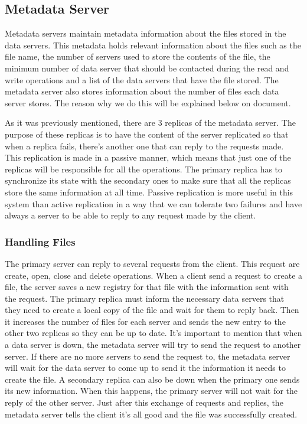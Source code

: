 \subsection{Metadata Server}

Metadata servers maintain metadata information about the files stored
in the data servers. This metadata holds relevant information about
the files such as the file name, the number of servers used to store
the contents of the file, the minimum number of data server that should
be contacted during the read and write operations and a list of the
data servers that have the file stored. The metadata server also stores
information about the number of files each data server stores. The reason why
we do this will be explained below on document.

As it was previously mentioned, there are 3 replicas of the metadata
server. The purpose of these replicas is to have the content of the
server replicated so that when a replica fails, there's another one
that can reply to the requests made. This replication is made in a
passive manner, which means that just one of the replicas will be
responsible for all the operations. The primary replica has to
synchronize its state with the secondary ones to make sure that all
the replicas store the same information at all time. Passive replication
is more useful in this system than active replication in a way that we
can tolerate two failures and have always a server to be able to reply to
any request made by the client.

\subsubsection{Handling Files}

The primary server can reply to several requests from the client. This
request are create, open, close and delete operations.
When a client send a request to create a file, the server saves a new
registry for that file with the information sent with the request. The
primary replica must inform the necessary data servers that they need to
create a local copy of the file and wait for them to reply back. Then
it increases the number of files for each server and sends the new 
entry to the other two replicas so they can be up to date. It's important 
to mention that when a data server is down, the metadata server will try 
to send the request to another server. If there are no more servers to 
send the request to, the metadata server will wait for the data server 
to come up to send it the information it needs to create the file. A 
secondary replica can also be down when the primary one sends its new 
information. When this happens, the primary server will not wait for 
the reply of the other server. Just after this exchange of requests and
replies, the metadata server tells the client it's all good and the file 
was successfully created.

